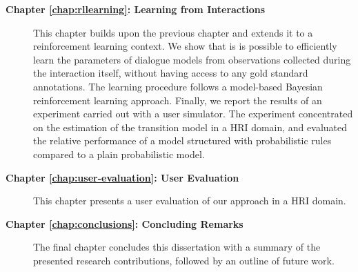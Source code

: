 \begin{description}
\item [\textbf{Chapter \ref{chap:rllearning}: Learning from Interactions}] \hfill  \vspace{2mm}

This chapter builds upon the previous chapter and extends it to a reinforcement learning context.  We show that is is possible to efficiently learn the parameters of dialogue models from observations collected during the interaction itself, without having access to any gold standard annotations.  The learning procedure follows a model-based Bayesian reinforcement learning approach. Finally, we report the results of an experiment carried out with a user simulator.  The experiment concentrated on the estimation of the transition model in a HRI domain, and evaluated the relative performance of a  model structured with probabilistic rules compared to a plain probabilistic model.   \vspace{2mm}

\item [\textbf{Chapter \ref{chap:user-evaluation}: User Evaluation}] \hfill  \vspace{2mm}

This chapter presents a user evaluation of our approach in a HRI domain.     \vspace{2mm}

\item [\textbf{Chapter \ref{chap:conclusions}: Concluding Remarks}] \hfill  \vspace{2mm}

The final chapter concludes this dissertation with a summary of the presented research contributions, followed by an outline of future work.   \vspace{2mm}

\end{description}

